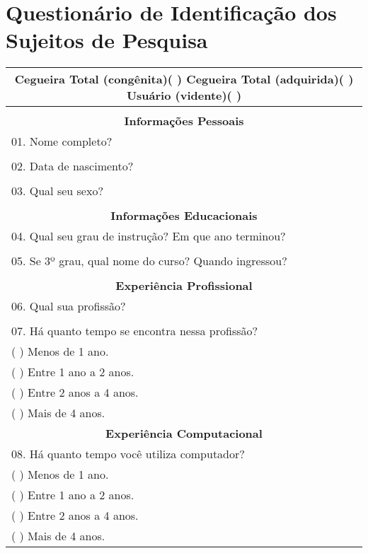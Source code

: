 \chapter{Questionário de Identificação dos Sujeitos de Pesquisa}
\begin{center}
\begin{longtable}{l}
\multicolumn{1}{c}{
Cegueira Total (congênita)(  )         Cegueira Total (adquirida)(  )          Usuário (vidente)(  )
}\\ 
\hline
\multicolumn{1}{c}{} \\ 
\multicolumn{1}{c}{\textbf{Informações Pessoais}} \\ 
01. Nome completo? \\ 
\hline
\multicolumn{1}{|l|}{} \\ 
\hline
02. Data de nascimento? \\ 
\hline
\multicolumn{1}{|l|}{} \\ 
\hline
03. Qual seu sexo? \\ 
\hline
\multicolumn{1}{|l|}{} \\ 
\hline
\multicolumn{1}{c}{\textbf{Informações Educacionais}} \\ 
04. Qual seu grau de instrução? Em que ano terminou? \\ 
\hline
\multicolumn{1}{|l|}{} \\ 
\hline
05. Se 3º grau, qual nome do curso? Quando ingressou? \\ 
\hline
\multicolumn{1}{|l|}{} \\ 
\hline
\multicolumn{1}{c}{\textbf{Experiência Profissional}} \\ 
06. Qual sua profissão? \\ 
\hline
\multicolumn{1}{|l|}{} \\ 
\hline
07. Há quanto tempo se encontra nessa profissão? \\ 
(   ) Menos de 1 ano. \\ 
(   ) Entre 1 ano a 2 anos. \\ 
(   ) Entre 2 anos a 4 anos. \\ 
(   ) Mais de 4 anos. \\ 
\multicolumn{1}{c}{\textbf{Experiência Computacional}} \\ 
08. Há quanto tempo você utiliza computador? \\ 
(   ) Menos de 1 ano. \\ 
(   ) Entre 1 ano a 2 anos. \\ 
(   ) Entre 2 anos a 4 anos. \\ 
(   ) Mais de 4 anos. \\ 

\end{longtable}
\end{center}
